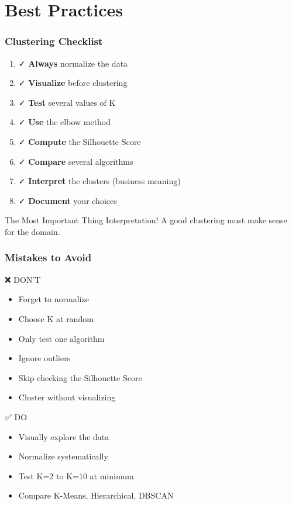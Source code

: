 \documentclass{beamer}
\begin{document}
\section{Best Practices}

\begin{frame}
\frametitle{Clustering Checklist}
\begin{enumerate}
    \item ✓ \textbf{Always} normalize the data
    \item ✓ \textbf{Visualize} before clustering
    \item ✓ \textbf{Test} several values of K
    \item ✓ \textbf{Use} the elbow method
    \item ✓ \textbf{Compute} the Silhouette Score
    \item ✓ \textbf{Compare} several algorithms
    \item ✓ \textbf{Interpret} the clusters (business meaning)
    \item ✓ \textbf{Document} your choices
\end{enumerate}

\vspace{1em}
\begin{alertblock}{The Most Important Thing}
Interpretation! A good clustering must make sense for the domain.
\end{alertblock}
\end{frame}

\begin{frame}
\frametitle{Mistakes to Avoid}
\begin{block}{❌ DON'T}
\begin{itemize}
    \item Forget to normalize
    \item Choose K at random
    \item Only test one algorithm
    \item Ignore outliers
    \item Skip checking the Silhouette Score
    \item Cluster without visualizing
\end{itemize}
\end{block}

\vspace{1em}
\begin{exampleblock}{✅ DO}
\begin{itemize}
    \item Visually explore the data
    \item Normalize systematically
    \item Test K=2 to K=10 at minimum
    \item Compare K-Means, Hierarchical, DBSCAN
\end{itemize}
\end{exampleblock}
\end{frame}
\end{document}
